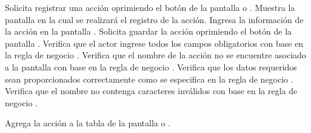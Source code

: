  \begin{UCtrayectoria}
    \UCpaso[\UCactor] Solicita registrar una acción oprimiendo el botón  de la pantalla  o .
    \UCpaso[\UCsist] Muestra la pantalla  en la cual se realizará el registro de la acción. 
    \UCpaso[\UCactor] Ingresa la información de la acción en la pantalla . \label{cu6.1.1:ingresaDatos}
    \UCpaso[\UCactor] Solicita guardar la acción oprimiendo el botón  de la pantalla . 
    \UCpaso[\UCsist] Verifica que el actor ingrese todos los campos obligatorios con base en la regla de negocio  . 
    \UCpaso[\UCsist] Verifica que el nombre de la acción no se encuentre asociado a la pantalla con base en la regla de negocio . 
    \UCpaso[\UCsist] Verifica que los datos requeridos sean proporcionados correctamente como se especifica en la regla de negocio .    
    \UCpaso[\UCsist] Verifica que el nombre no contenga caracteres inválidos con base en la regla de negocio . 
    
    \UCpaso[\UCsist] Agrega la acción a la tabla de la pantalla  o .
 \end{UCtrayectoria}
 
